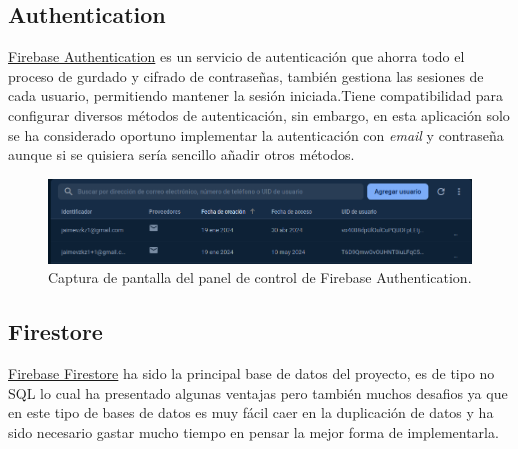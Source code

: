 \subsection{Authentication}
\href{https://firebase.google.com/docs/auth/}{Firebase Authentication} es un servicio de autenticación que ahorra todo el proceso de gurdado y cifrado de contraseñas, también gestiona las sesiones de cada usuario, permitiendo mantener la sesión iniciada.Tiene compatibilidad para configurar diversos métodos de autenticación, sin embargo, en esta aplicación solo se ha considerado oportuno implementar la autenticación con \textit{email} y contraseña aunque si se quisiera sería sencillo añadir otros métodos.
\begin{figure}[h]
    \centering
    \includegraphics[width = 1\textwidth]{Imagenes/Fuentes/ejemplo_auth.png}
    \caption{Captura de pantalla del panel de control de Firebase Authentication.}
    \label{fig:ejemplo_auth}
\end{figure}
\hypertarget{subsec:firestore}{}
\subsection{Firestore} 
\href{https://firebase.google.com/docs/firestore/}{Firebase Firestore} ha sido la principal base de datos del proyecto, es de tipo no SQL lo cual ha presentado algunas ventajas pero también muchos desafios ya que en este tipo de bases de datos es muy fácil caer en la duplicación de datos y ha sido necesario gastar mucho tiempo en pensar la mejor forma de implementarla. 

